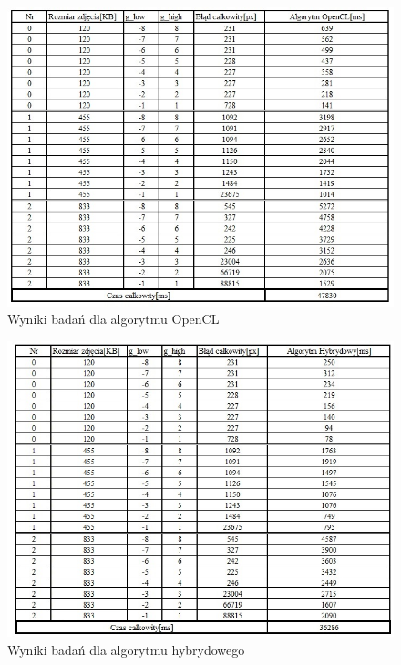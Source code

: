 \documentclass[document.tex]{subfiles}
\begin{document}
\begin{figure}[h]
\includegraphics[scale=0.75]{imgs/results_pc_gpu.jpg}
\caption{Wyniki badań dla algorytmu OpenCL}
\label{fig:results_pc_gpu}
\end{figure}

\begin{figure}[h]
\includegraphics[scale=0.75]{imgs/results_pc_hybrid.jpg}
\caption{Wyniki badań dla algorytmu hybrydowego}
\label{fig:results_pc_hybrid}
\end{figure}

\end{document}

